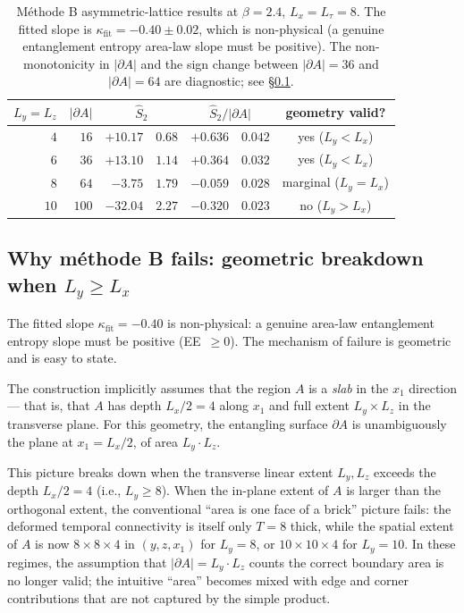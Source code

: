 \documentclass[11pt,a4paper]{article}
\theoremstyle{definition}
\begin{document}
\begin{table}[t]
\centering
\begin{tabular}{rrr@{$\;\pm\;$}lr@{$\;\pm\;$}lc}
\toprule
$L_y = L_z$ & $|\partial A|$
            & \multicolumn{2}{c}{$\widehat S_2$}
            & \multicolumn{2}{c}{$\widehat S_2/|\partial A|$}
            & geometry valid? \\
\midrule
$4$  & $16$  & $+10.17$ & $0.68$ & $+0.636$ & $0.042$ & yes ($L_y < L_x$) \\
$6$  & $36$  & $+13.10$ & $1.14$ & $+0.364$ & $0.032$ & yes ($L_y < L_x$) \\
$8$  & $64$  & $-3.75$  & $1.79$ & $-0.059$ & $0.028$ & marginal ($L_y = L_x$) \\
$10$ & $100$ & $-32.04$ & $2.27$ & $-0.320$ & $0.023$ & no ($L_y > L_x$) \\
\bottomrule
\end{tabular}
\caption{Méthode B asymmetric-lattice results at $\beta = 2.4$,
$L_x = L_\tau = 8$. The fitted slope is
$\kappa_{\mathrm{fit}} = -0.40 \pm 0.02$, which is non-physical (a
genuine entanglement entropy area-law slope must be positive). The
non-monotonicity in $|\partial A|$ and the sign change between
$|\partial A| = 36$ and $|\partial A| = 64$ are diagnostic; see
\S\ref{app:methodeB-failure}.}
\label{tab:methodeB-results}
\end{table}

\subsection{Why méthode B fails: geometric breakdown when $L_y \ge L_x$}
\label{app:methodeB-failure}

The fitted slope $\kappa_{\mathrm{fit}} = -0.40$ is non-physical: a
genuine area-law entanglement entropy slope must be positive
(EE~$\ge 0$). The mechanism of failure is geometric and is easy to
state.

The construction implicitly assumes that the region $A$ is a
\emph{slab} in the $x_1$ direction --- that is, that $A$ has depth
$L_x/2 = 4$ along $x_1$ and full extent $L_y \times L_z$ in the
transverse plane. For this geometry, the entangling surface
$\partial A$ is unambiguously the plane at $x_1 = L_x/2$, of area
$L_y\cdot L_z$.

This picture breaks down when the transverse linear extent
$L_y, L_z$ exceeds the depth $L_x/2 = 4$ (i.e., $L_y \ge 8$). When
the in-plane extent of $A$ is larger than the orthogonal extent,
the conventional ``area is one face of a brick'' picture fails:
the deformed temporal connectivity is itself only $T = 8$ thick,
while the spatial extent of $A$ is now $8 \times 8 \times 4$ in
$(y, z, x_1)$ for $L_y = 8$, or $10 \times 10 \times 4$ for $L_y =
10$. In these regimes, the assumption that $|\partial A| = L_y\cdot
L_z$ counts the correct boundary area is no longer valid; the
intuitive ``area'' becomes mixed with edge and corner contributions
that are not captured by the simple product.
\end{document}
